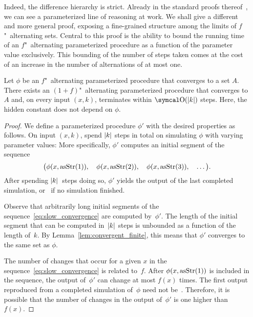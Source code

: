 Indeed, the difference hierarchy is strict.
Already in the standard proofs thereof~\parencite{arslanov1997degree,ershov1968hierarchyi,putnam1965trial}, we can see a parameterized line of reasoning at work.
We shall give a different and more general proof, exposing a fine-grained structure among the limits of $f$"~alternating sets.
Central to this proof is the ability to bound the running time of an $f$"~alternating parameterized procedure as a function of the parameter value exclusively.
This bounding of the number of steps taken comes at the cost of an increase in the number of alternations of at most one.
\begin{theorem}
\label{thm:slow_convergence}%
  Let $\phi$ be an $f$"~alternating parameterized procedure that converges to a set $A$.
  There exists an $(1 + f)$"~alternating parameterized procedure that converges to $A$ and, on every input $(x, k)$, terminates within $\bigO(\length{k})$ steps.
  Here, the hidden constant does not depend on $\phi$.
\end{theorem}
\begin{proof}
  We define a parameterized procedure $\phi'$ with the desired properties as follows.
  On input $(x, k)$, spend ${\lvert k\rvert}$ steps in total on simulating $\phi$ with varying parameter values:
  More specifically, $\phi'$ computes an initial segment of the sequence
  \begin{equation}
  \label{eq:slow_convergence}
    \big(\phi(x, \operatorname{asStr}(1)),\quad \phi(x, \operatorname{asStr}(2)),\quad \phi(x, \operatorname{asStr}(3)), \quad \ldots\big).
  \end{equation}
  After spending ${\lvert k\rvert}$~steps doing so, $\phi'$ yields the output of the last completed simulation, or~ if no simulation finished.

  Observe that arbitrarily long initial segments of the sequence~\eqref{eq:slow_convergence} are computed by~$\phi'$.
  The length of the initial segment that can be computed in~${\lvert k\rvert}$ steps is unbounded as a function of the length of~$k$.
  By Lemma~\ref{lem:convergent_finite}, this means that $\phi'$ converges to the same set as $\phi$.

  The number of changes that occur for a given $x$ in the sequence~\eqref{eq:slow_convergence} is related to~$f$.
  After $\phi(x, \operatorname{asStr}(1))$ is included in the sequence, the output of~$\phi'$ can change at most $f(x)$ times.
  The first output reproduced from a completed simulation of~$\phi$ need not be~.
  Therefore, it is possible that the number of changes in the output of~$\phi'$ is one higher than~$f(x)$.
\end{proof}

